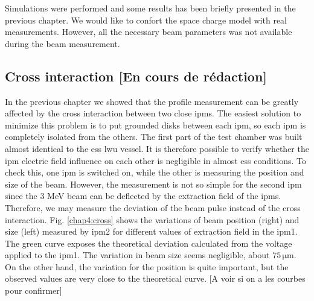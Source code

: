 \begin{refsection}
  Simulations were performed and some results has been briefly presented in the previous chapter. We would like to confort the space charge model with real measurements. However, all the necessary beam parameters was not available during the beam measurement.     

  \subsection{Cross interaction [En cours de rédaction]}

  In the previous chapter we showed that the profile measurement can be greatly affected by the cross interaction between two close \acrshort{ipm}s. The easiest solution to minimize this problem is to put grounded disks between each \acrshort{ipm}, so each \acrshort{ipm} is completely isolated from the others. The first part of the test chamber was built almost identical to the \acrshort{ess} \acrshort{lwu} vessel. It is therefore possible to verify whether the \acrshort{ipm} electric field influence on each other is negligible in almost \acrshort{ess} conditions. To check this, one \acrshort{ipm} is switched on, while the other is measuring the position and size of the beam. However, the measurement is not so simple for the second \acrshort{ipm} since the 3 MeV beam can be deflected by the extraction field of the \acrshort{ipm}s. Therefore, we may measure the deviation of the beam pulse instead of the cross interaction. Fig. \ref{chap4:cross} shows the variations of beam position (right) and size (left) measured by \acrshort{ipm}2 for different values of extraction field in the \acrshort{ipm}1. The green curve exposes the theoretical deviation calculated from the voltage applied to the \acrshort{ipm}1. The variation in beam size seems negligible, about $75\,\mathrm{\mu m}$. On the other hand, the variation for the position is quite important, but the observed values are very close to the theoretical curve.
  [A voir si on a les courbes pour confirmer]

  


\end{refsection}
